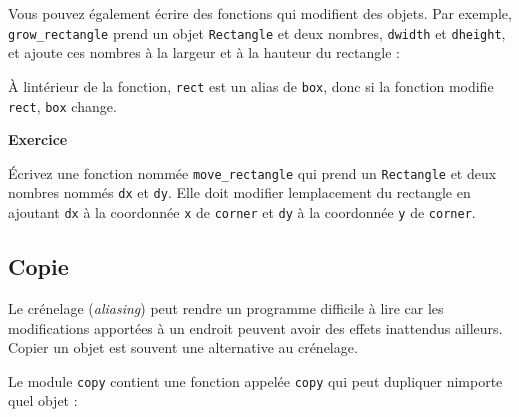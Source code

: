 \begin{Shaded}
\begin{Highlighting}[]
\OperatorTok{=}\OperatorTok{+} 
\OperatorTok{=}\OperatorTok{+} 
\end{Highlighting}
\end{Shaded}

Vous pouvez également écrire des fonctions qui modifient des objets. Par
exemple, \texttt{grow\_rectangle} prend un objet \texttt{Rectangle} et
deux nombres, \texttt{dwidth} et \texttt{dheight}, et ajoute ces nombres
à la largeur et à la hauteur du rectangle :

\begin{Shaded}
\begin{Highlighting}[]
\OperatorTok{+=}
\OperatorTok{+=}
\end{Highlighting}
\end{Shaded}

À l\textquotesingle intérieur de la fonction, \texttt{rect} est un alias
de \texttt{box}, donc si la fonction modifie \texttt{rect}, \texttt{box}
change.

\textbf{Exercice}

Écrivez une fonction nommée \texttt{move\_rectangle} qui prend un
\texttt{Rectangle} et deux nombres nommés \texttt{dx} et \texttt{dy}.
Elle doit modifier l\textquotesingle emplacement du rectangle en
ajoutant \texttt{dx} à la coordonnée \texttt{x} de \texttt{corner} et
\texttt{dy} à la coordonnée \texttt{y} de \texttt{corner}.

\hypertarget{copie}{%
\subsection{Copie}\label{copie}}

Le crénelage (\emph{aliasing}) peut rendre un programme difficile à lire
car les modifications apportées à un endroit peuvent avoir des effets
inattendus ailleurs. Copier un objet est souvent une alternative au
crénelage.

Le module \texttt{copy} contient une fonction appelée \texttt{copy} qui
peut dupliquer n\textquotesingle importe quel objet :

\begin{Shaded}
\begin{Highlighting}[]
\OperatorTok{\textgreater{}\textgreater{}\textgreater{}}\OperatorTok{=}
\OperatorTok{\textgreater{}\textgreater{}\textgreater{}}\OperatorTok{=} 
\OperatorTok{\textgreater{}\textgreater{}\textgreater{}}\OperatorTok{=} 

\OperatorTok{\textgreater{}\textgreater{}\textgreater{}} 
\OperatorTok{\textgreater{}\textgreater{}\textgreater{}}\OperatorTok{=}
\end{Highlighting}
\end{Shaded}

